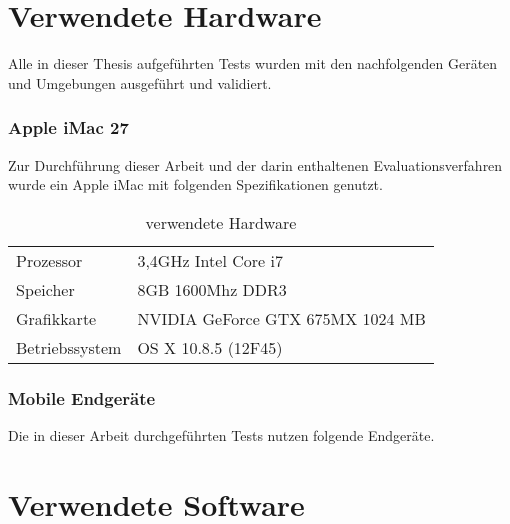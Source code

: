 	\pagebreak
	\section{Verwendete Hardware}
	Alle in dieser Thesis aufgeführten Tests wurden mit den nachfolgenden Geräten und Umgebungen ausgeführt und validiert.
	
	\subsubsection{Apple iMac 27\texttt\dq}
	Zur Durchführung dieser Arbeit und der darin enthaltenen Evaluationsverfahren wurde ein Apple iMac mit folgenden 				Spezifikationen genutzt.
	
	\begin{table}[H]
	 \vspace{-20pt}
 		\centering
			\begin{tabular}{| p{4cm} | p{8cm}  |}
			\hline
				Prozessor			&	3,4GHz Intel Core i7 \\
				Speicher			&	8GB 1600Mhz DDR3\\
				Grafikkarte		&	NVIDIA GeForce GTX 675MX 1024 MB\\
				Betriebssystem		&	OS X 10.8.5 (12F45)\\

				\hline
				\end{tabular}
			\caption{verwendete Hardware}
	\end{table}

	\subsubsection{Mobile Endgeräte}
	Die in dieser Arbeit durchgeführten Tests nutzen folgende Endgeräte. 
	
	
	

	\section{Verwendete Software}
	
